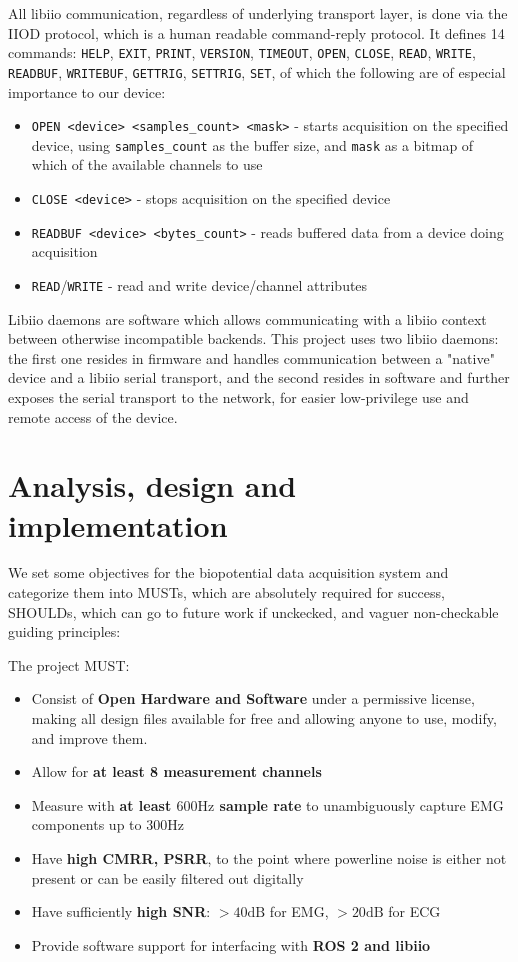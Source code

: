 \documentclass{thesis}
\newcommand{\Hz}{\unit{\hertz}}
\newcommand{\dB}{\unit{\deci\bel}}
\begin{document}
All libiio communication, regardless of underlying transport layer, is done via the IIOD protocol, which is a human readable command-reply protocol. It defines 14 commands: \texttt{HELP}, \texttt{EXIT}, \texttt{PRINT}, \texttt{VERSION}, \texttt{TIMEOUT}, \texttt{OPEN}, \texttt{CLOSE}, \texttt{READ}, \texttt{WRITE}, \texttt{READBUF}, \texttt{WRITEBUF}, \texttt{GETTRIG}, \texttt{SETTRIG}, \texttt{SET}, of which the following are of especial importance to our device:
\begin{itemize}
	\item \texttt{OPEN <device> <samples\_count> <mask>} - starts acquisition on the specified device, using \texttt{samples\_count} as the buffer size, and \texttt{mask} as a bitmap of which of the available channels to use
    \item \texttt{CLOSE <device>} - stops acquisition on the specified device
    \item \texttt{READBUF <device> <bytes\_count>} - reads buffered data from a device doing acquisition
    \item \texttt{READ}/\texttt{WRITE} - read and write device/channel attributes
\end{itemize}

Libiio daemons are software which allows communicating with a libiio context between otherwise incompatible backends. This project uses two libiio daemons: the first one resides in firmware and handles communication between a "native" device and a libiio serial transport, and the second resides in software and further exposes the serial transport to the network, for easier low-privilege use and remote access of the device.

\newpage
\section{Analysis, design and implementation}

We set some objectives for the biopotential data acquisition system and categorize them into MUSTs, which are absolutely required for success, SHOULDs, which can go to future work if unckecked, and vaguer non-checkable guiding principles:

The project MUST:

\begin{itemize}
    \item Consist of \textbf{Open Hardware and Software} under a permissive license, making all design files available for free and allowing anyone to use, modify, and improve them.
    \item Allow for \textbf{at least 8 measurement channels}
    \item Measure with \textbf{at least $600\Hz$ sample rate} to unambiguously capture EMG components up to $300\Hz$
    \item Have \textbf{high CMRR, PSRR}, to the point where powerline noise is either not present or can be easily filtered out digitally
    \item Have sufficiently \textbf{high SNR}: $>40\dB$ for EMG, $>20\dB$ for ECG
    \item Provide software support for interfacing with \textbf{ROS 2 and libiio}
\end{itemize}
\end{document}
